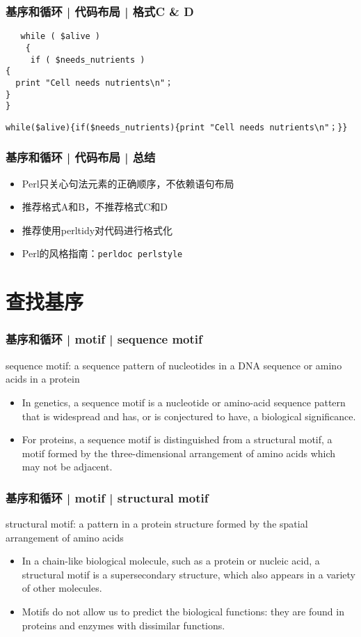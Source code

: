 \begin{frame}[fragile]
  \frametitle{基序和循环 | 代码布局 | 格式C \& D}
\begin{lstlisting}
   while ( $alive )
    {
     if ( $needs_nutrients )
{
  print "Cell needs nutrients\n"；
}
}
\end{lstlisting}
\pause
\begin{lstlisting}
while($alive){if($needs_nutrients){print "Cell needs nutrients\n"；}}
\end{lstlisting}
\end{frame}

\begin{frame}[fragile]
  \frametitle{基序和循环 | 代码布局 | 总结}
  \begin{itemize}
    \item Perl只关心句法元素的正确顺序，不依赖语句布局
    \item 推荐格式A和B，不推荐格式C和D
    \item 推荐使用perltidy对代码进行格式化
    \item Perl的风格指南：\verb|perldoc perlstyle|
  \end{itemize}
\end{frame}

\section{查找基序}
\begin{frame}
  \frametitle{基序和循环 | motif | sequence motif}
  \begin{block}{sequence motif: a sequence pattern of nucleotides in a DNA sequence or amino acids in a protein}
    \begin{itemize}
      \item In genetics, a sequence motif is a nucleotide or amino-acid sequence pattern that is widespread and has, or is conjectured to have, a biological significance.
      \item For proteins, a sequence motif is distinguished from a structural motif, a motif formed by the three-dimensional arrangement of amino acids which may not be adjacent.
    \end{itemize}
  \end{block}
\end{frame}

\begin{frame}
  \frametitle{基序和循环 | motif | structural motif}
  \begin{block}{structural motif: a pattern in a protein structure formed by the spatial arrangement of amino acids}
    \begin{itemize}
      \item In a chain-like biological molecule, such as a protein or nucleic acid, a structural motif is a supersecondary structure, which also appears in a variety of other molecules.
      \item Motifs do not allow us to predict the biological functions: they are found in proteins and enzymes with dissimilar functions.
    \end{itemize}
  \end{block}
\end{frame}


